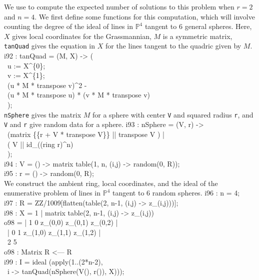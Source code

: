 We use \Mtwo{}\/ to compute the expected number of
solutions to this problem when $r=2$ and $n=4$.
We first define some functions for this computation, which will involve
counting the degree of the ideal of lines in ${\mathbb P}^4$ tangent to 6
general spheres.
Here, $X$ gives local coordinates for the Grassmannian,
$M$ is a symmetric matrix, {\tt tanQuad} gives the equation in $X$ for the
lines tangent to the quadric given by $M$.
%
\beginOutput
i92 : tanQuad = (M, X) -> (\\
\           u := X^\{0\};\\
\           v := X^\{1\};\\
\           (u * M * transpose v)^2 - \\
\           (u * M * transpose u) * (v * M * transpose v)\\
\           );\\
\endOutput
%
{\tt nSphere} gives the matrix $M$ for a sphere with
center {\tt V} and squared radius {\tt r}, and {\tt V} and {\tt r} give random
data for a sphere.
%
\beginOutput
i93 : nSphere = (V, r) -> \\
\               (matrix \{\{r + V * transpose V\}\} || transpose V ) |\\
\               ( V || id_((ring r)^n)\\
\               );\\
\endOutput
%
\beginOutput
i94 : V = () -> matrix table(1, n, (i,j) -> random(0, R));\\
\endOutput
%
\beginOutput
i95 : r = () -> random(0, R);\\
\endOutput
%
We construct the ambient ring, local coordinates, and the ideal of the
enumerative problem of lines in ${\mathbb P}^4$ tangent to 6 random spheres.
%
\beginOutput
i96 : n = 4;\\
\endOutput
%
\beginOutput
i97 : R = ZZ/1009[flatten(table(2, n-1, (i,j) -> z_(i,j)))];\\
\endOutput
%
\beginOutput
i98 : X = 1 | matrix table(2, n-1, (i,j) -> z_(i,j))\\
\emptyLine
o98 = | 1 0 z_(0,0) z_(0,1) z_(0,2) |\\
\      | 0 1 z_(1,0) z_(1,1) z_(1,2) |\\
\emptyLine
\              2       5\\
o98 : Matrix R  <--- R\\
\endOutput
%
\beginOutput
i99 : I = ideal (apply(1..(2*n-2), \\
\                     i -> tanQuad(nSphere(V(), r()), X)));\\
